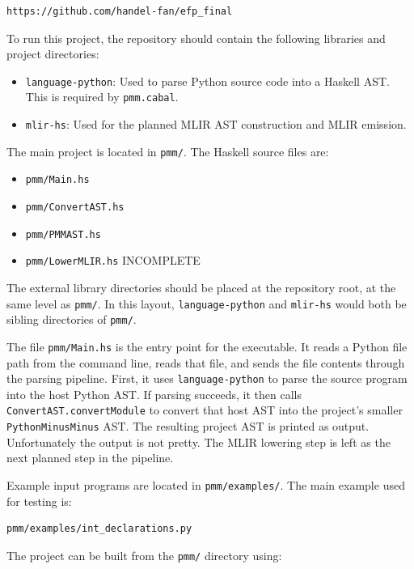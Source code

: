 \documentclass[11pt]{article}
\begin{document}
\begin{verbatim}
https://github.com/handel-fan/efp_final
\end{verbatim}

To run this project, the repository should contain the following libraries and
project directories:

\begin{itemize}
	\item \texttt{language-python}: Used to parse Python source code into a Haskell
	      AST. This is required by \texttt{pmm.cabal}.
	\item \texttt{mlir-hs}: Used for the planned MLIR AST construction and MLIR
	      emission.
\end{itemize}

The main project is located in \texttt{pmm/}. The Haskell source files are:

\begin{itemize}
	\item \texttt{pmm/Main.hs}
	\item \texttt{pmm/ConvertAST.hs}
	\item \texttt{pmm/PMMAST.hs}
	\item \texttt{pmm/LowerMLIR.hs} INCOMPLETE
\end{itemize}
The external library directories should be placed at the repository root, at the
same level as \texttt{pmm/}. In this layout, \texttt{language-python} and
\texttt{mlir-hs} would both be sibling directories of \texttt{pmm/}.

The file \texttt{pmm/Main.hs} is the entry point for the executable. It reads a
Python file path from the command line, reads that file, and sends the file
contents through the parsing pipeline. First, it uses \texttt{language-python}
to parse the source program into the host Python AST. If parsing succeeds, it
then calls \texttt{ConvertAST.convertModule} to convert that host AST into the
project's smaller \texttt{PythonMinusMinus} AST. The resulting project AST is
printed as output. Unfortunately the output is not pretty. The MLIR lowering
step is left as the next planned step in the pipeline.

Example input programs are located in \texttt{pmm/examples/}. The main example
used for testing is:

\begin{verbatim}
pmm/examples/int_declarations.py
\end{verbatim}

The project can be built from the \texttt{pmm/} directory using:
\end{document}
